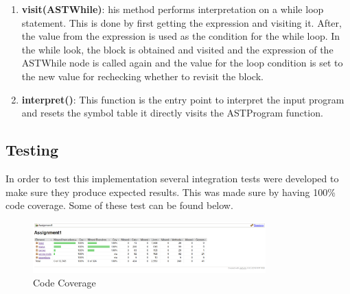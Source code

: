 \documentclass{article}
\begin{document}
\begin{enumerate}
						\item \textbf{visit(ASTWhile)}: his method performs interpretation on a while loop statement. This is done by first getting the expression and visiting it. After, the value from the expression is used as the condition for the while loop. In the while look, the block is obtained and visited and the expression of the ASTWhile node is called again and the value for the loop condition is set to the new value for rechecking whether to revisit the block.
	
	
						\item \textbf{interpret()}: This function is the entry point to interpret the input program and resets the symbol table it directly visits the ASTProgram function.
						

			\end{enumerate}
			
			\subsection{Testing}
			
			In order to test this implementation several integration tests were developed to make sure they produce expected results. This was made sure by having 100\% code coverage. Some of these test can be found below.
			
								\begin{figure}[H]
					\centering
			 			\includegraphics[width=0.8\textwidth]{jacoco.png}
			 			\centering
			  			\caption{Code Coverage}
			  			\label{fig:jacoco}
					\end{figure}
					
					\pagebreak
					
\end{document}
